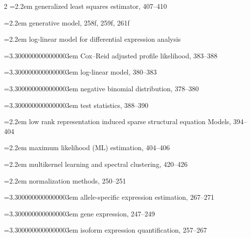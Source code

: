 \begin{multicols}{2}
\noindent\hangindent=2.2em \hspace*{1.1em}generalized least squares estimator, 407--410\par
\noindent\hangindent=2.2em \hspace*{1.1em}generative model, 258f, 259f, 261f\par
\noindent\hangindent=2.2em \hspace*{1.1em}log-linear model for differential expression analysis\par
\noindent\hangindent=3.3000000000000003em \hspace*{2.2em}Cox--Reid adjusted profile likelihood, 383--388\par
\noindent\hangindent=3.3000000000000003em \hspace*{2.2em}log-linear model, 380--383\par
\noindent\hangindent=3.3000000000000003em \hspace*{2.2em}negative binomial distribution, 378--380\par
\noindent\hangindent=3.3000000000000003em \hspace*{2.2em}test statistics, 388--390\par
\noindent\hangindent=2.2em \hspace*{1.1em}low rank representation induced sparse structural equation Models, 394--404\par
\noindent\hangindent=2.2em \hspace*{1.1em}maximum likelihood (ML) estimation, 404--406\par
\noindent\hangindent=2.2em \hspace*{1.1em}multikernel learning and spectral clustering, 420--426\par
\noindent\hangindent=2.2em \hspace*{1.1em}normalization methods, 250--251\par
\noindent\hangindent=3.3000000000000003em \hspace*{2.2em}allele-specific expression estimation, 267--271\par
\noindent\hangindent=3.3000000000000003em \hspace*{2.2em}gene expression, 247--249\par
\noindent\hangindent=3.3000000000000003em \hspace*{2.2em}isoform expression quantification, 257--267\par

\end{multicols}
